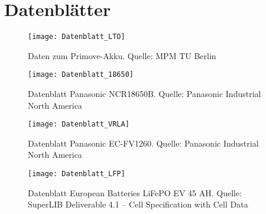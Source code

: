 \appendix
\label{an_Datenblaetter}
\chapter{Datenblätter}
\begin{figure}[h!]\centering
	\texttt{[image: Datenblatt\_LTO]}
	\caption[Daten zum Primove-Akku]{Daten zum Primove-Akku. Quelle: MPM TU Berlin}
\end{figure}

\begin{figure}\centering
	\texttt{[image: Datenblatt\_18650]}
	\caption[Datenblatt Panasonic NCR18650B]{Datenblatt Panasonic NCR18650B. Quelle: Panasonic Industrial North America}
\end{figure}

\begin{figure}\centering
	\texttt{[image: Datenblatt\_VRLA]}
	\caption[Datenblatt Panasonic EC-FV1260]{Datenblatt Panasonic EC-FV1260. Quelle: Panasonic Industrial North America}
\end{figure}

\begin{figure}\centering
	\texttt{[image: Datenblatt\_LFP]}
	\caption[Datenblatt European Batteries LiFePO EV 45 AH]{Datenblatt European Batteries LiFePO EV 45 AH. Quelle: SuperLIB Deliverable 4.1 – Cell Specification with Cell Data}
\end{figure}